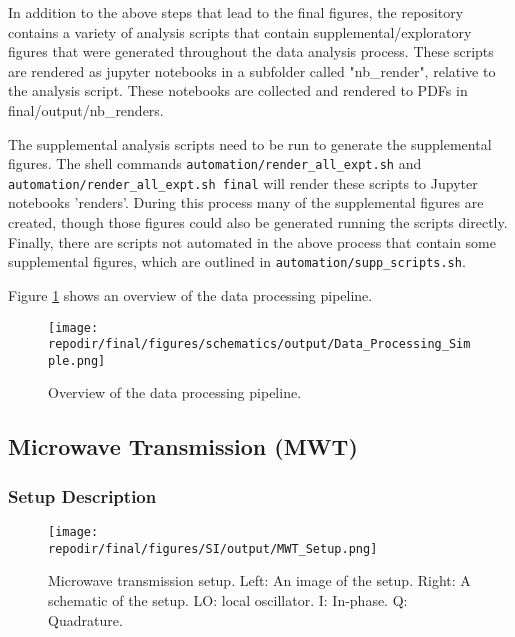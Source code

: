 In addition to the above steps that lead to the final figures, the repository contains a variety of analysis scripts that contain supplemental/exploratory figures that were generated throughout the data analysis process. These scripts are rendered as jupyter notebooks in a subfolder called "nb\_render", relative to the analysis script. These notebooks are collected and rendered to PDFs in final/output/nb\_renders. 

The supplemental analysis scripts need to be run to generate the supplemental figures. The shell commands \texttt{automation/render\_all\_expt.sh} and \texttt{automation/render\_all\_expt.sh final} will render these scripts to Jupyter notebooks 'renders'. During this process many of the supplemental figures are created, though those figures could also be generated running the scripts directly. Finally, there are scripts not automated in the above process that contain some supplemental figures, which are outlined in \texttt{automation/supp\_scripts.sh}. 

Figure \ref{fig:SI_Data_Processing_Simple} shows an overview of the data processing pipeline.

\begin{figure}[H]
\centering
\texttt{[image: \\repodir/final/figures/schematics/output/Data\_Processing\_Simple.png]}
\caption{Overview of the data processing pipeline.}
\label{fig:SI_Data_Processing_Simple}
\end{figure}


\clearpage
\subsection{Microwave Transmission (MWT)}


\subsubsection{Setup Description}
\begin{figure}[]
\centering
\texttt{[image: \\repodir/final/figures/SI/output/MWT\_Setup.png]}
\caption{Microwave transmission setup. Left: An image of the setup. Right: A schematic of the setup. LO: local oscillator. I: In-phase. Q: Quadrature.  }
\label{fig:SI_MWT_Setup}
\end{figure}

